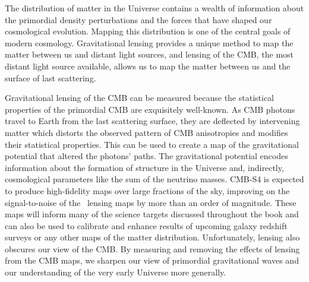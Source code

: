 The distribution of matter in the Universe contains a wealth of information about the primordial density perturbations and the forces that have shaped our cosmological evolution. Mapping this distribution is one of the central goals of modern cosmology. Gravitational lensing provides a unique method to map the matter between us and distant light sources, and lensing of the CMB, the most distant light source available, allows us to map the matter between us and the surface of last scattering.

Gravitational lensing of the CMB can be measured because the statistical properties of the primordial CMB are exquisitely well-known. As CMB photons travel to Earth from the last scattering surface, they are deflected by intervening matter which distorts the observed pattern of CMB anisotropies and modifies their statistical properties. This can be used to create a map of the gravitational potential that altered the photons' paths. The gravitational potential encodes information about the formation of structure in the Universe and, indirectly, cosmological parameters like the sum of the neutrino masses.  CMB-S4 is expected to produce high-fidelity maps over large fractions of the sky, improving on the signal-to-noise of  the \planck\ lensing maps by more than an order of magnitude.  These maps will inform many of the science targets discussed throughout the book and can also be used to calibrate and enhance results of upcoming galaxy redshift surveys or any other maps of the matter distribution.  Unfortunately, lensing also obscures our view of the CMB.  By measuring and removing the effects of lensing from the CMB maps, we sharpen our view of primordial gravitational waves and our understanding of the very early Universe more generally.  
